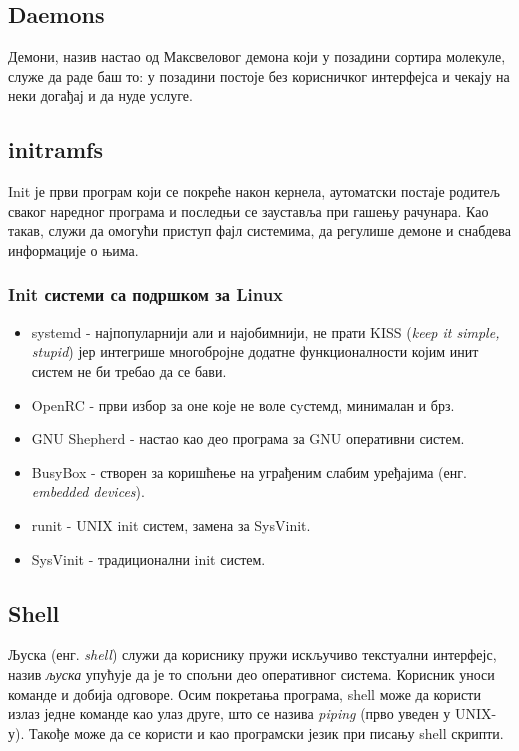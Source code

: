 \documentclass[a4paper,14pt]{article}
\begin{document}
\subsection{Daemons}
Демони\cite{daemon}, назив настао од Максвеловог демона који у позадини сортира молекуле, служе да раде баш то: у позадини постоје без корисничког интерфејса и чекају на неки догађај и да нуде услуге.

\subsection{initramfs}
Init је први програм који се покреће након кернела, аутоматски постаје родитељ сваког наредног програма и последњи се зауставља при гашењу рачунара. Као такав, служи да омогући приступ фајл системима, да регулише демоне и снабдева информације о њима.
\subsubsection{Init системи са подршком за  Linux}
\begin{itemize}
\item systemd - најпопуларнији али и најобимнији, не прати KISS (\textit{keep it simple, stupid}) јер интегрише многобројне додатне функционалности којим инит систем не би требао да се бави.
\item OpenRC - први избор за оне које не воле сyстемд, минималан и брз.
\item GNU Shepherd - настао као део програма за GNU оперативни систем.
\item BusyBox - створен за коришћење на уграђеним слабим уређајима (енг. \textit{embedded devices}).
\item runit - UNIX init систем, замена за SysVinit.
\item SysVinit - традиционални init систем.
\end{itemize}
\newpage

\subsection{Shell}
Љуска (енг. \textit{shell}) служи да кориснику пружи искључиво текстуални интерфејс, назив \textit{љуска} упућује да је то спољни део оперативног система. Корисник уноси команде и добија одговоре. Осим покретања програма, shell може да користи излаз једне команде као улаз друге, што се назива \textit{piping} (прво уведен у UNIX-у). Такође може да се користи и као програмски језик при писању shell скрипти.
\end{document}
